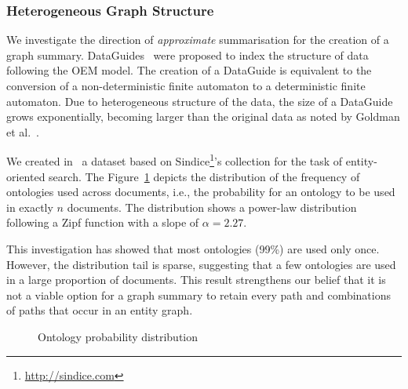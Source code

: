 \subsubsection{Heterogeneous Graph Structure}

We investigate the direction of \emph{approximate} summarisation for the creation of a graph summary. DataGuides~\cite{goldman1997dataguides} were proposed to index the structure of data following the OEM model.
The creation of a DataGuide is equivalent to the conversion of a non-deterministic finite automaton to a deterministic finite automaton.
Due to heterogeneous structure of the data, the size of a DataGuide grows exponentially, becoming larger than the original data as noted by Goldman et al.~\cite{goldman1999approximate}.

We created in~\cite{campinas:2011:eos} a dataset based on Sindice\footnote{\url{http://sindice.com}}'s collection for the task of entity-oriented search. The Figure~\ref{fig:onto-dist} depicts the distribution of the frequency of ontologies used across documents, i.e., the probability for an ontology to be used in exactly $n$ documents. The distribution shows a power-law distribution following a Zipf function with a slope of $\alpha = 2.27$.

This investigation has showed that most ontologies (99\%) are used only once. However, the distribution tail is sparse, suggesting that a few ontologies are used in a large proportion of documents.
This result strengthens our belief that it is not a viable option for a graph summary to retain every path and combinations of paths that occur in an entity graph.

\begin{figure}
	\centering
	
	\caption{Ontology probability distribution}
	\label{fig:onto-dist}
\end{figure}


